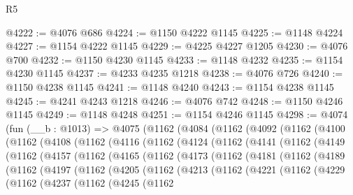 \begin{lexlean}{R5}
\begin{coremodule}
@4222 := @4076 @686
@4224 := @1150 @4222 @1145
@4225 := @1148 @4224
@4227 := @1154 @4222 @1145
@4229 := @4225 @4227 @1205
@4230 := @4076 @700
@4232 := @1150 @4230 @1145
@4233 := @1148 @4232
@4235 := @1154 @4230 @1145
@4237 := @4233 @4235 @1218
@4238 := @4076 @726
@4240 := @1150 @4238 @1145
@4241 := @1148 @4240
@4243 := @1154 @4238 @1145
@4245 := @4241 @4243 @1218
@4246 := @4076 @742
@4248 := @1150 @4246 @1145
@4249 := @1148 @4248
@4251 := @1154 @4246 @1145
@4298 := @4074
    (fun (__b : @1013) =>
    @4075
      (@1162
        (@4084
          (@1162
            (@4092
              (@1162
                (@4100
                  (@1162
                    (@4108
                      (@1162
                        (@4116
                          (@1162
                            (@4124
                              (@1162
                                (@4141
                                  (@1162
                                    (@4149
                                      (@1162
                                        (@4157
                                          (@1162
                                            (@4165
                                              (@1162
                                                (@4173
                                                  (@1162
                                                    (@4181
                                                      (@1162
                                                        (@4189
                                                          (@1162
                                                            (@4197
                                                              (@1162
                                                                (@4205
                                                                  (@1162
                                                                    (@4213
                                                                      (@1162
                                                                        (@4221
                                                                          (@1162
                                                                            (@4229
                                                                              (@1162
                                                                                (@4237
                                                                                  (@1162
                                                                                    (@4245
                                                                                      (@1162

\end{coremodule}
\end{lexlean}
